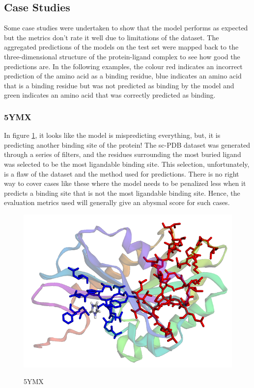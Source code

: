 \documentclass[journal=jacsat,manuscript=article]{achemso}
\begin{document}
\subsection{Case Studies}
\quad Some case studies were undertaken to show that the model performs as expected but the metrics don't rate it well due to limitations of the dataset. The aggregated predictions of the models on the test set were mapped back to the three-dimensional structure of the protein-ligand complex to see how good the predictions are. In the following examples, the colour red indicates an incorrect prediction of the amino acid as a binding residue, blue indicates an amino acid that is a binding residue but was not predicted as binding by the model and green indicates an amino acid that was correctly predicted as binding.

\subsubsection{5YMX}
\quad In figure \ref{fig:5ymx}, it looks like the model is mispredicting everything, but, it is predicting another binding site of the protein! The sc-PDB dataset was generated through a series of filters, and the residues surrounding the most buried ligand was selected to be the most ligandable binding site. This selection, unfortunately, is a flaw of the dataset and the method used for predictions. There is no right way to cover cases like these where the model needs to be penalized less when it predicts a binding site that is not the most ligandable binding site. Hence, the evaluation metrics used will generally give an abysmal score for such cases.
\begin{figure}
    \caption{\centering 5YMX}
    \centering
    \noindent\includegraphics[scale=0.4]{5ymx.png}
    \label{fig:5ymx}
\end{figure}
\end{document}
